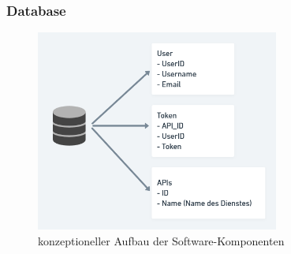 \subsubsection{Database}
\begin{figure}[h]
\centering
\includegraphics[width=80mm]{pictures/Database.png}
\caption{konzeptioneller Aufbau der Software-Komponenten}
\end{figure}


